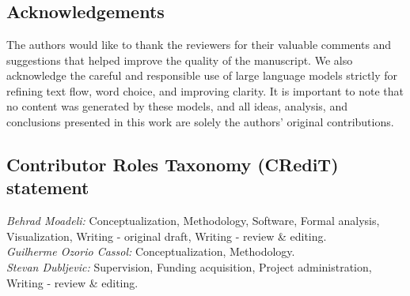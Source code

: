 \section*{} 
\newpage
\subsection*{Acknowledgements}
\label{sec:ack}

The authors would like to thank the reviewers for their valuable comments and suggestions that helped improve the quality of the manuscript. We also acknowledge the careful and responsible use of large language models strictly for refining text flow, word choice, and improving clarity. It is important to note that no content was generated by these models, and all ideas, analysis, and conclusions presented in this work are solely the authors’ original contributions.

\subsection*{Contributor Roles Taxonomy (CRediT) statement}

\textit{Behrad Moadeli:} Conceptualization, Methodology, Software, Formal analysis, Visualization, Writing - original draft, Writing - review \& editing.\\
\textit{Guilherme Ozorio Cassol:} Conceptualization, Methodology.\\
\textit{Stevan Dubljevic:} Supervision, Funding acquisition, Project administration, Writing - review \& editing.